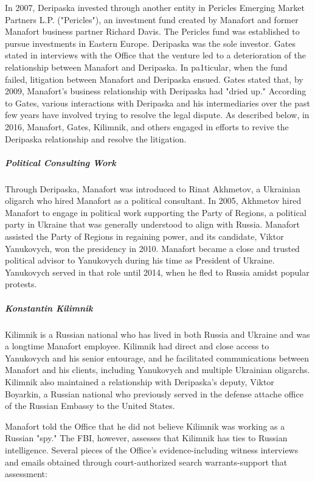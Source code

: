 In 2007, Deripaska invested through another entity in Pericles Emerging Market Partners L.P. ("Pericles"), an investment fund created by Manafort and former Manafort business partner Richard Davis.
The Pericles fund was established to pursue investments in Eastern Europe.%
Deripaska was the sole investor.%
Gates stated in interviews with the Office that the venture led to a deterioration of the relationship between Manafort and Deripaska.%
In pa1ticular, when the fund failed, litigation between Manafort and Deripaska ensued.
Gates stated that, by 2009, Manafort's business relationship with Deripaska had "dried up."%
According to Gates, various interactions with Deripaska and his intermediaries over the past few years have involved trying to resolve the legal dispute.%
As described below, in 2016, Manafort, Gates, Kilimnik, and others engaged in efforts to revive the Deripaska relationship and resolve the litigation.

\subparagraph{Political Consulting Work}

Through Deripaska, Manafort was introduced to Rinat Akhmetov, a Ukrainian oligarch who hired Manafort as a political consultant.%
In 2005, Akhmetov hired Manafort to engage in political work supporting the Party of Regions,%
a political party in Ukraine that was generally understood to align with Russia.
Manafort assisted the Party of Regions in regaining power, and its candidate, Viktor Yanukovych, won the presidency in 2010.
Manafort became a close and trusted political advisor to Yanukovych during his time as President of Ukraine.
Yanukovych served in that role until 2014, when he fled to Russia amidst popular protests.%

\subparagraph{Konstantin Kilimnik}

Kilimnik is a Russian national who has lived in both Russia and Ukraine and was a longtime Manafort employee.%
Kilimnik had direct and close access to Yanukovych and his senior entourage, and he facilitated communications between Manafort and his clients, including Yanukovych and multiple Ukrainian oligarchs.%
Kilimnik also maintained a relationship with Deripaska's deputy, Viktor Boyarkin,%
a Russian national who previously served in the defense attache office of the Russian Embassy to the United States.%

Manafort told the Office that he did not believe Kilimnik was working as a Russian "spy."%
The FBI, however, assesses that Kilimnik has ties to Russian intelligence.%
Several pieces of the Office's evidence-including witness interviews and emails obtained through court-authorized search warrants-support that assessment:

